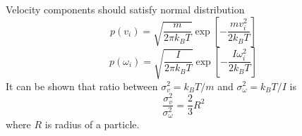 Velocity components should satisfy normal distribution 
\begin{equation}
\label{eq:maxwell_boltzmann_velocity_components}
		p(v_i)
			= \sqrt{ \frac{m}{2 \pi k_BT}}
			\exp \left[-\frac{mv_i^2}{2k_BT}\right]
\end{equation}
\begin{equation}
		p(\omega_i)
			= \sqrt{ \frac{I}{2 \pi k_BT}}
			\exp\left[-\frac{I\omega_i^2}{2k_BT}\right]
\end{equation}
It can be shown that ratio between $\sigma^2_v = k_BT/m$ and $\sigma^2_\omega = k_BT/I$ is
\begin{equation}
\label{eq:velocity_deviation_relation}
	\frac{\sigma^2_v}{\sigma^2_\omega} = \frac{2}{3}R^2
\end{equation}
where $R$ is radius of a particle.

